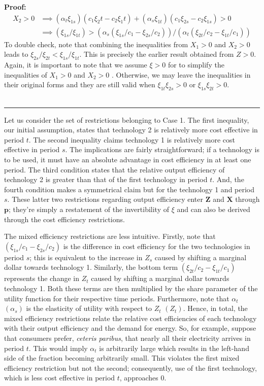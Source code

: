 \documentclass[11pt,a4paper,leqno]{extarticle}
\newenvironment{proof}[1][Proof]{\noindent\textbf{#1:} }{\ \rule{0.5em}{0.5em}}
\begin{document}
\begin{proof}
		\begin{align*}
		X_2 > 0 &\implies (\alpha_t \xi_{1s})(c_1 \xi_2t - c_2\xi_1t) + (\alpha_s \xi_{1t})(c_1 \xi_{2s} - c_2 \xi_{1s}) > 0\\
		&\implies (\xi_{1s}/\xi_{1t}) > (\alpha_s (\xi_{1s}/c_1 -  \xi_{2s}/c_2))/(\alpha_t(\xi_{2t}/c_2 - \xi_{1t}/c_1)) 
		\end{align*}
		To double check, note that combining the inequalities from $X_1>0$ and $X_2 > 0$ leads to $\xi_{2s}/\xi_{2t} < \xi_{1s}/\xi_{1t}$. This is precisely the earlier result obtained from $Z > 0$. Again, it is  important to note that we assume $\xi > 0$ for to simplify the inequalities of $X_1 > 0$ and $X_2 > 0$ . Otherwise, we may leave the inequalities in their original forms and they are still valid when  $\xi_{1t} \xi_{2s} > 0$ or $\xi_{1s} \xi_{2t} > 0$.   \\ \hfill
	\end{proof}
	
	Let us consider the set of restrictions belonging to Case 1. The first inequality, our initial assumption, states that technology 2 is relatively more cost effective in period $t$. The second inequality claims technology 1 is relatively more cost effective in period $s$. The implications are fairly straightforward; if a technology is to be used, it must have an absolute advantage in cost efficiency in at least one period. The third condition states that the relative output efficiency of technology 2 is greater than that of the first technology in period $t$. And, the fourth condition makes a symmetrical claim but for the technology 1 and period $s$. These latter two restrictions regarding output efficiency enter $\mathbf{Z}$ and $\mathbf{X}$ through $\mathbf{p}$; they're simply a restatement of the invertibility of $\xi$ and can also be derived through the cost efficiency restrictions. 
	
	The mixed efficiency restrictions are less intuitive. Firstly, note that $\left(\xi_{1s}/c_1 - \xi_{2s}/c_2\right)$ is the difference in cost efficiency for the two technologies in period $s$; this is equivalent to the increase in $Z_s$ caused by shifting a marginal dollar towards technology 1. Similarly, the bottom term $\left( \xi_{2t}/c_2 - \xi_{1t}/c_1 \right)$ represents the change in $Z_t$ caused by shifting a marginal dollar towards technology 1. Both these terms are then multiplied by the share parameter of the utility function for their respective time periods. Furthermore, note that $\alpha_t$ $(\alpha_s)$ is the elasticity of utility with respect to $Z_t$ $(Z_t)$. Hence, in total, the mixed efficiency restrictions relate the relative cost efficiencies of each technology with their output efficiency and the demand for energy. So, for example, suppose that consumers prefer, \textit{ceteris paribus}, that nearly all their electricity arrives in period $t$. This would imply $\alpha_t$ is arbitrarily large which results in the left-hand side of the fraction becoming arbitrarily small. This violates the first mixed efficiency restriction but not the second; consequently, use of the first technology, which is less cost effective in period $t$, approaches $0$. 
	
\end{document}
